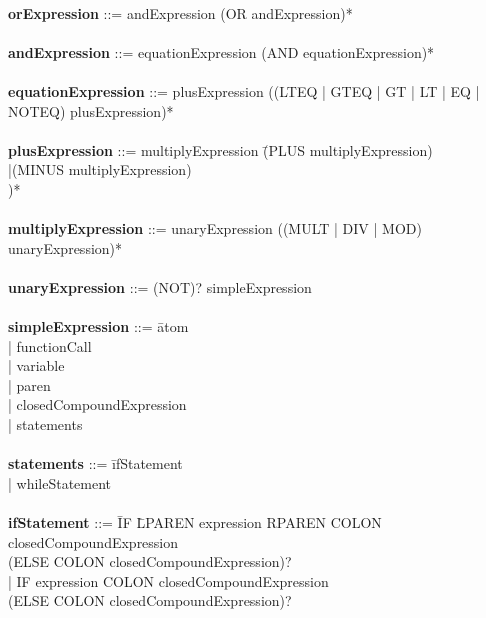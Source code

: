 \begin{tabbing}
\\   
{\bf orExpression}                ::= andExpression (OR andExpression)*\\
\\   
{\bf andExpression}               ::= equationExpression (AND equationExpression)*\\
\\ 
{\bf equationExpression}          ::= plusExpression ((LTEQ | GTEQ | GT | LT | EQ | NOTEQ) plusExpression)*\\
\\ 
{\bf plusExpression}              ::= multiplyExpression \= (PLUS multiplyExpression)\\
                                                         \>|(MINUS multiplyExpression)\\
                                                         \>)*\\
\\
{\bf multiplyExpression}          ::= unaryExpression ((MULT | DIV | MOD) unaryExpression)*\\
\\
{\bf unaryExpression}             ::= (NOT)? simpleExpression\\
\\   
{\bf simpleExpression}            ::= \=atom\\
                                      \>| functionCall\\
                                      \>| variable\\
                                      \>| paren\\
                                      \>| closedCompoundExpression\\
                                      \>| statements\\
\\
{\bf statements}                  ::= \=ifStatement\\
                                      \>| whileStatement\\
\\
{\bf ifStatement}                 ::= \=IF \=LPAREN expression RPAREN COLON closedCompoundExpression\\
                                      \>\>(ELSE COLON closedCompoundExpression)?\\
                                      \>| IF expression COLON closedCompoundExpression \\
                                      \>\>(ELSE COLON closedCompoundExpression)?\\

\end{tabbing}
